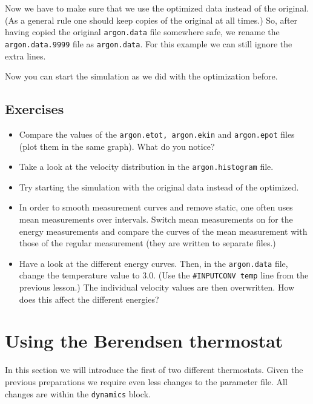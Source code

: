 Now we have to make sure that we use the optimized data instead of the original.
(As a general rule one should keep copies of the original at all times.) So,
after having copied the original \texttt{argon.data} file somewhere safe,
we rename the \texttt{argon.data.9999} file as \texttt{argon.data}.
For this example we can still ignore the extra lines. 

Now you can start the simulation as we did with the optimization before.

\subsection{Exercises}
\begin{itemize}
\item Compare the values of the \texttt{argon.etot, argon.ekin} and \texttt{argon.epot} files (plot them in the same graph). What do you notice?
\item Take a look at the velocity distribution in the \texttt{argon.histogram} file. 
\item Try starting the simulation with the original data instead of the optimized.
\item In order to smooth measurement curves and remove static, one often uses mean measurements over intervals. Switch mean measurements on for the energy measurements and compare the curves of the mean measurement with those of the regular measurement (they are written to separate files.)
\item Have a look at the different energy curves. Then, in the \texttt{argon.data} file, change the temperature value to 3.0. (Use the \texttt{\#INPUTCONV temp} line from the previous lesson.) The individual velocity values are then overwritten. How does this affect the different energies?
\end{itemize}


\section{Using the Berendsen thermostat}
In this section we will introduce the first of two different thermostats. Given the previous preparations we require even less changes to the parameter file. All changes are within the \texttt{dynamics} block.

